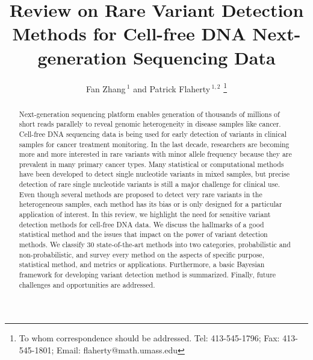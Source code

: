 \documentclass[a4,center,fleqn]{NAR}
\begin{document}
\title{Review on Rare Variant Detection Methods for Cell-free DNA Next-generation Sequencing Data}

\author{%
Fan Zhang\,$^{1}$
and Patrick Flaherty\,$^{1, 2}$
\footnote{To whom correspondence should be addressed.
Tel: 413-545-1796; Fax: 413-545-1801; Email: flaherty@math.umass.edu}}



\address{%
$^{1}$Department of Biomedical Engineering, Worcester Polytechnic Institute, MA, USA
and
$^{2}$Department of Mathematics and Statistics, University of Massachusetts, Amherst, MA, USA}


\maketitle

\begin{abstract}
Next-generation sequencing platform enables generation of thousands of millions of short reads parallely to reveal genomic heterogeneity in disease samples like cancer.
Cell-free DNA sequencing data is being used for early detection of variants in clinical samples for cancer treatment monitoring.
In the last decade, researchers are becoming more and more interested in rare variants with minor allele frequency because they are prevalent in many primary cancer types.
Many statistical or computational methods have been developed to detect single nucleotide variants in mixed samples, but precise detection of rare single nucleotide variants is still a major challenge for clinical use.
Even though several methods are proposed to detect very rare variants in the heterogeneous samples, each method has its bias or is only designed for a particular application of interest.
In this review, we highlight the need for sensitive variant detection methods for cell-free DNA data.
We discuss the hallmarks of a good statistical method and the issues that impact on the power of variant detection methods.
We classify 30 state-of-the-art methods into two categories, probabilistic and non-probabilistic, and survey every method on the aspects of specific purpose, statistical method, and metrics or applications.
Furthermore, a basic Bayesian framework for developing variant detection method is summarized.
Finally, future challenges and opportunities are addressed.

\end{abstract}
\end{document}
